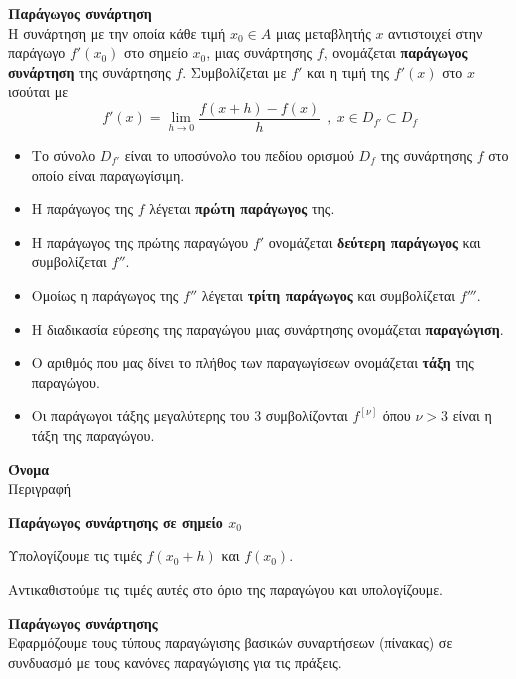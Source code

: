 \documentclass[twoside,nofonts,internet,math,spyros]{frontisthrio}
\begin{document}
\begin{arithmisi}
\begin{center}
\end{center}
\item\textbf{Παράγωγος συνάρτηση}\\
Η συνάρτηση με την οποία κάθε τιμή $ x_0\in A $ μιας μεταβλητής $ x $ αντιστοιχεί στην παράγωγο $ f'(x_0) $ στο σημείο $ x_0 $, μιας συνάρτησης $ f $, ονομάζεται \textbf{παράγωγος συνάρτηση} της συνάρτησης $ f $. Συμβολίζεται με $ f' $ και η τιμή της $ f'(x) $ στο $ x $ ισούται με 
\[ f'(x)=\lim_{h\to 0}\frac{f(x+h)-f(x)}{h}\ \ ,\ x\in D_{f'}\subset D_f \]
\begin{itemize}[itemsep=0mm]
\item Το σύνολο $ D_{f'} $ είναι το υποσύνολο του πεδίου ορισμού $ D_f $ της συνάρτησης $ f $ στο οποίο είναι παραγωγίσιμη.
\item Η παράγωγος της $ f $ λέγεται \textbf{πρώτη παράγωγος} της.
\item Η παράγωγος της πρώτης παραγώγου $ f' $ ονομάζεται \textbf{δεύτερη παράγωγος} και συμβολίζεται $ f'' $.
\item Ομοίως η παράγωγος της $ f'' $ λέγεται \textbf{τρίτη παράγωγος} και συμβολίζεται $ f''' $.
\item Η διαδικασία εύρεσης της παραγώγου μιας συνάρτησης ονομάζεται \textbf{παραγώγιση}.
\item Ο αριθμός που μας δίνει το πλήθος των παραγωγίσεων ονομάζεται \textbf{τάξη} της παραγώγου.
\item Οι παράγωγοι τάξης μεγαλύτερης του $ 3 $ συμβολίζονται $ f^{[\nu]} $ όπου $ \nu>3 $ είναι η τάξη της παραγώγου.
\end{itemize}
\end{arithmisi}
\thewrhmata
\begin{arithmisi}
\item\textbf{Όνομα}\\
Περιγραφή
\end{arithmisi}
\methodologia
\begin{arithmisi}
\item\textbf{Παράγωγος συνάρτησης σε σημείο $ x_0 $}
\begin{bhma}
\item Υπολογίζουμε τις τιμές $f(x_0+h)$ και $f(x_0)$.
\item Αντικαθιστούμε τις τιμές αυτές στο όριο της παραγώγου και υπολογίζουμε.
\end{bhma}
\item\textbf{Παράγωγος συνάρτησης}\\
Εφαρμόζουμε τους τύπους παραγώγισης βασικών συναρτήσεων (πίνακας) σε συνδυασμό με τους κανόνες παραγώγισης για τις πράξεις.
\end{arithmisi}
\end{document}
